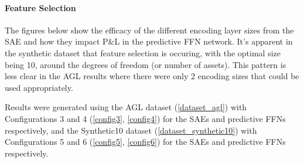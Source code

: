 \documentclass[a4paper,latin]{paper}
\begin{document}
\paragraph{Feature Selection}

The figures below show the efficacy of the different encoding layer sizes from the SAE and how they impact P\&L in the predictive FFN network. It's apparent in the synthetic dataset that feature selection is occuring, with the optimal size being 10, around the degrees of freedom (or number of assets). This pattern is less clear in the AGL results where there were only 2 encoding sizes that could be used appropriately.\newline

Results were generated using the AGL dataset (\ref{dataset_agl}) with Configurations 3 and 4 (\ref{config3}, \ref{config4}) for the SAEs and predictive FFNs respectively, and the Synthetic10 dataset (\ref{dataset_synthetic10}) with Configurations 5 and 6 (\ref{config5}, \ref{config6}) for the  SAEs and predictive FFNs respectively.
\end{document}
